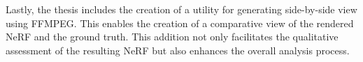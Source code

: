 Lastly, the thesis includes the creation of a utility for generating side-by-side view using FFMPEG\cite{tomar2006converting}. This enables the creation of a comparative view of the rendered NeRF and the ground truth. This addition not only facilitates the qualitative assessment of the resulting NeRF but also enhances the overall analysis process.

\begin{comment}
\begin{itemize}
    \item Pipeline from CARLA to Nerfstudio
    \begin{itemize}
        \item Enables experimenting with data capture techniques that can later be applied to real world scenarios.
        \item Enables running multiple experiments with different experiment settings, e.g. camera setup, vehicle speed, route, image resolution, etc., in a streamlined way.
        \item The data output from the experiment-pipeline in CARLA is in a format supported by most NeRFs. Enables training NeRFs on the synthetic data captured in CARLA, and, based on the evaluation of the NeRF, tweak settings to improve the resulting image synthesis.
    \end{itemize}
    \item A baseline for NeRFs trained on synthetic data captured in CARLA. 
    \begin{itemize}
        \item Can be used to further improve both the data capture and the NeRF-models on synthetic data.
        \item Can be used to experiment with data capture- and NeRF-settings.
        \item The metrics used to evaluate the baseline (PSNR, SSIM and LPIPS) are widely used throughout NeRF-research and makes comparable.
    \end{itemize}
    \item Block NeRF in Nerfstudio API
    \begin{itemize}
        \item Creates a naive Block NeRF implementation with the Nerfstudio API, demonstrating how such an approach can substantially increase the quality of large scene NeRFs.
        \item The PoC allows testing which parameters are important when capturing large-scale data for NeRFs. E.g. the segment size, overlap between the blocks, and image merging techniques.
    \end{itemize}
    \item Side-by-side view
    \begin{itemize}
        \item Leverage FFMPEG to create a script for generating side-by-side views of the rendered NeRF and the ground truth.
        \item Makes qualitative assessment of the resulting NeRF easier.
    \end{itemize}
\end{itemize}

\end{comment}
